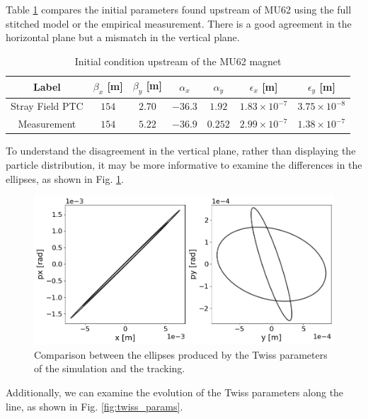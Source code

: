 Table \ref{tab:twiss_parameters} compares the initial parameters found upstream of MU62 using the full stitched model or the empirical measurement. There is a good agreement in the horizontal plane but a mismatch in the vertical plane.

\begin{table}[htbp]
\centering
\caption{Initial condition upstream of the MU62 magnet}
\label{tab:twiss_parameters}
\begin{tabular}{|c|c|c|c|c|c|c|}
\hline
Label & $\beta_{x}$ [m] & $\beta_{y}$ [m] & $\alpha_{x}$ & $\alpha_{y}$ & $\epsilon_x$ [m] & $\epsilon_y$ [m] \\
\hline
Stray Field PTC & $154$ & $2.70$ & $-36.3$ & $1.92$ & $1.83 \times 10^{-7}$ & $3.75 \times 10^{-8}$ \\
\hline
Measurement & $154$ & $5.22$ & $-36.9$ & $0.252$ & $2.99 \times 10^{-7}$ & $1.38 \times 10^{-7}$ \\
\hline
\end{tabular}
\end{table}

To understand the disagreement in the vertical plane, rather than displaying the particle distribution, it may be more informative to examine the differences in the ellipses, as shown in Fig. \ref{fig:ellipses}.

\begin{figure}[H]
\centering
\includegraphics[width=1.0\textwidth]{02_Simulation/images/ellipses.png}
\caption{Comparison between the ellipses produced by the Twiss parameters of the simulation and the tracking.}
\label{fig:ellipses}
\end{figure}

Additionally, we can examine the evolution of the Twiss parameters along the line, as shown in Fig. \ref{fig:twiss_params}.

